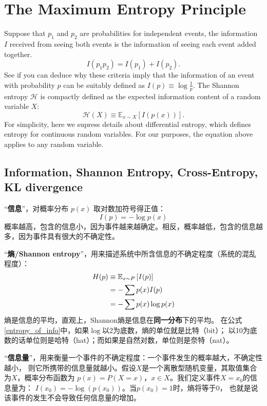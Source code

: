 ﻿
\section{The Maximum Entropy Principle}

Suppose that $p_1$ and $p_2$ are probabilities for independent events, the 
information $I$ received from seeing both events is the information of seeing 
each event added together.
$$
I(p_1p_2) = I(p_1) + I(p_2).
$$
\noindent{}See if you can deduce why these criteria imply that the information 
of an event with probability $p$ can be suitably defined as 
$I(p) \equiv \log \frac{1}{p}$.
\noindent{}The Shannon entropy $\mathcal{H}$ is compactly defined as the 
expected information content of a random variable $X$:
$$
\mathcal{H}(X) \equiv \mathbb{E}_{x\sim X}\left[I(p(x))\right].
$$
\noindent{}For simplicity, here we supress details about differential entropy, 
which defines entropy for continuous random variables. For our purposes, the 
equation above applies to any random variable.


\subsection{Information, Shannon Entropy, Cross-Entropy, KL divergence}

“{\bf 信息}”，对概率分布 $p(x)$ 取对数加符号得正值：
$$
I(p) = -\log p(x)
$$
概率越高，包含的信息小，因为事件越来越确定。相反，概率越低，包含的信息越多，因为事件具有很大的不确定性。

“{\bf 熵/Shannon entropy}”，用来描述系统中所含信息的不确定程度（系统的混乱程度）：
\begin{align}\label{entropy_of_info}
H(p) 
&\equiv \mathbb{E}_{x\sim P}\left[I(p)\right] \notag \\
&= - \sum p(x) I(p) \notag \\
&= - \sum p(x) \log p(x)
\end{align}
熵是信息的平均，直观上，Shannon熵是信息在{\bf 同一分布}下的平均。
在公式\eqref{entropy_of_info}中，如果$\log$以2为底数，熵的单位就是比特（bit）；
以10为底数的话单位则是哈特（hat）；而如果是自然对数，单位则是奈特（nat）。

“{\bf 信息量}”，用来衡量一个事件的不确定程度：一个事件发生的概率越大，不确定性越小，
则它所携带的信息量就越小。假设$X$是一个离散型随机变量，其取值集合为$X$，概率分布函数为
$p(x)=P(X=x)$，$x\in X$。我们定义事件$X=x_0$的信息量为：
$I(x_0) = -\log(p(x_0))$。当$p(x_0)=1$时，熵将等于$0$，
也就是说该事件的发生不会导致任何信息量的增加。

